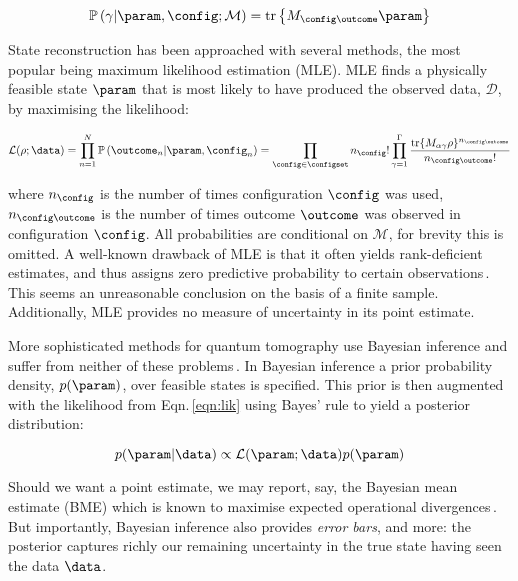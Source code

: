 \begin{equation}
\mathbb{P}\left(\gamma\vert\param,\config;\mathcal{M}\right) = \text{tr}\left\{M_{\config\outcome}\param \right\}\label{eqn:born}\notag
\end{equation}

State reconstruction has been approached with several methods, the most popular being maximum likelihood estimation (MLE). MLE finds a physically feasible state $\param$ that is most likely to have produced the observed data, $\mathcal{D}$, by maximising the likelihood:

\begin{equation}
\label{eqn:lik}
\mathcal{L}(\rho;\data)=\prod_{n=1}^{N} \mathbb{P}\left(\outcome_n\vert\param,\config_n\right) = \prod_{\config \in \configset}n_{\config}!\prod_{\gamma=1}^{\Gamma}\frac{\mbox{tr}\{M_{\alpha\gamma}\rho\}^{n_{\config\outcome}}}{n_{\config\outcome}!}
\end{equation}

where $n_{\config}$ is the number of times configuration $\config$ was used, $n_{\config\outcome}$ is the number of times outcome $\outcome$ was observed in configuration $\config$. All probabilities are conditional on $\mathcal{M}$, for brevity this is omitted. A well-known drawback of MLE is that it often yields rank-deficient estimates, and thus assigns zero predictive probability to certain observations\,\cite{BayesianTomography}. This seems an unreasonable conclusion on the basis of a finite sample.
Additionally, MLE provides no measure of uncertainty in its point estimate.

More sophisticated methods for quantum tomography use Bayesian inference and suffer from neither of these problems\,\cite[][and refs.]{BayesianTomography}. In Bayesian inference a prior probability density, $p(\param)$, over feasible states is specified. This prior is then augmented with the likelihood from Eqn.\,\eqref{eqn:lik} using Bayes' rule to yield a posterior distribution:

\begin{equation}
\label{eqn:bayes}
p(\param\vert\data)\propto \mathcal{L}(\param;\data)p(\param)
\end{equation}

Should we want a point estimate, we may report, say, the Bayesian mean estimate (BME) which is known to maximise expected operational divergences\,\cite{BayesianTomography,BayesianOptimality}. But importantly, Bayesian inference also provides \emph{error bars}, and more: the posterior captures richly our remaining uncertainty in the true state having seen the data $\data$. 


